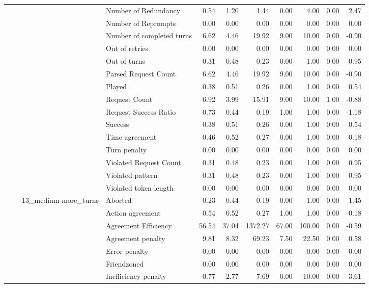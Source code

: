 \begin{tabular}{llllrrrrrrr}
 &  &  & Number of Redundancy & 0.54 & 1.20 & 1.44 & 0.00 & 4.00 & 0.00 & 2.47 \\
 &  &  & Number of Reprompts & 0.00 & 0.00 & 0.00 & 0.00 & 0.00 & 0.00 & 0.00 \\
 &  &  & Number of completed turns & 6.62 & 4.46 & 19.92 & 9.00 & 10.00 & 0.00 & -0.90 \\
 &  &  & Out of retries & 0.00 & 0.00 & 0.00 & 0.00 & 0.00 & 0.00 & 0.00 \\
 &  &  & Out of turns & 0.31 & 0.48 & 0.23 & 0.00 & 1.00 & 0.00 & 0.95 \\
 &  &  & Parsed Request Count & 6.62 & 4.46 & 19.92 & 9.00 & 10.00 & 0.00 & -0.90 \\
 &  &  & Played & 0.38 & 0.51 & 0.26 & 0.00 & 1.00 & 0.00 & 0.54 \\
 &  &  & Request Count & 6.92 & 3.99 & 15.91 & 9.00 & 10.00 & 1.00 & -0.88 \\
 &  &  & Request Success Ratio & 0.73 & 0.44 & 0.19 & 1.00 & 1.00 & 0.00 & -1.18 \\
 &  &  & Success & 0.38 & 0.51 & 0.26 & 0.00 & 1.00 & 0.00 & 0.54 \\
 &  &  & Time agreement & 0.46 & 0.52 & 0.27 & 0.00 & 1.00 & 0.00 & 0.18 \\
 &  &  & Turn penalty & 0.00 & 0.00 & 0.00 & 0.00 & 0.00 & 0.00 & 0.00 \\
 &  &  & Violated Request Count & 0.31 & 0.48 & 0.23 & 0.00 & 1.00 & 0.00 & 0.95 \\
 &  &  & Violated pattern & 0.31 & 0.48 & 0.23 & 0.00 & 1.00 & 0.00 & 0.95 \\
 &  &  & Violated token length & 0.00 & 0.00 & 0.00 & 0.00 & 0.00 & 0.00 & 0.00 \\
\cline{3-11}
 &  & \multirow[t]{27}{*}{13_medium-more_turns} & Aborted & 0.23 & 0.44 & 0.19 & 0.00 & 1.00 & 0.00 & 1.45 \\
 &  &  & Action agreement & 0.54 & 0.52 & 0.27 & 1.00 & 1.00 & 0.00 & -0.18 \\
 &  &  & Agreement Efficiency & 56.54 & 37.04 & 1372.27 & 67.00 & 100.00 & 0.00 & -0.59 \\
 &  &  & Agreement penalty & 9.81 & 8.32 & 69.23 & 7.50 & 22.50 & 0.00 & 0.58 \\
 &  &  & Error penalty & 0.00 & 0.00 & 0.00 & 0.00 & 0.00 & 0.00 & 0.00 \\
 &  &  & Friendzoned & 0.00 & 0.00 & 0.00 & 0.00 & 0.00 & 0.00 & 0.00 \\
 &  &  & Inefficiency penalty & 0.77 & 2.77 & 7.69 & 0.00 & 10.00 & 0.00 & 3.61 \\

\end{tabular}
